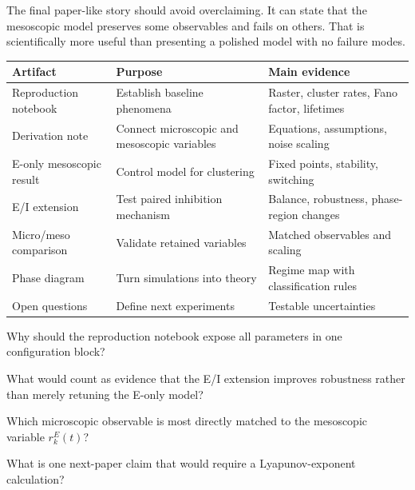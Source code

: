 The final paper-like story should avoid overclaiming. It can state that the mesoscopic model preserves some observables and fails on others. That is scientifically more useful than presenting a polished model with no failure modes.

\begin{chaptersummary}

\begin{center}
\renewcommand{\arraystretch}{1.45}
\begin{tabularx}{\textwidth}{@{}l X X@{}}
  \toprule
  \textbf{Artifact} & \textbf{Purpose} & \textbf{Main evidence} \\
  \midrule
  Reproduction notebook & Establish baseline phenomena & Raster, cluster rates, Fano factor, lifetimes \\
  Derivation note & Connect microscopic and mesoscopic variables & Equations, assumptions, noise scaling \\
  E-only mesoscopic result & Control model for clustering & Fixed points, stability, switching \\
  E/I extension & Test paired inhibition mechanism & Balance, robustness, phase-region changes \\
  Micro/meso comparison & Validate retained variables & Matched observables and scaling \\
  Phase diagram & Turn simulations into theory & Regime map with classification rules \\
  Open questions & Define next experiments & Testable uncertainties \\
  \bottomrule
\end{tabularx}
\end{center}

\end{chaptersummary}

\begin{conceptquestions}
  \item Why should the reproduction notebook expose all parameters in one configuration block?
  \item What would count as evidence that the E/I extension improves robustness rather than merely retuning the E-only model?
  \item Which microscopic observable is most directly matched to the mesoscopic variable $r_k^E(t)$?
  \item What is one next-paper claim that would require a Lyapunov-exponent calculation?
\end{conceptquestions}
